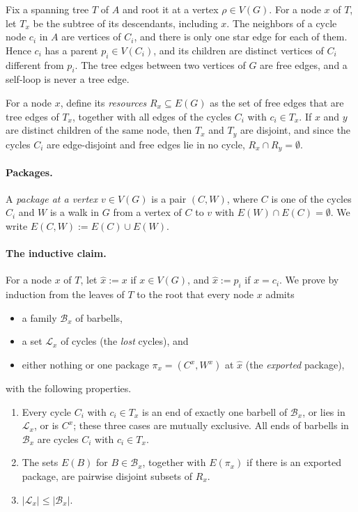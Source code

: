 \documentclass[11pt,a4paper]{article}
\theoremstyle{definition}
\theoremstyle{remark}
\begin{document}
Fix a spanning tree \(T\) of \(A\) and root it at a vertex \(\rho\in V(G)\).
For a node \(x\) of \(T\), let \(T_x\) be the subtree of its descendants,
including \(x\). The neighbors of a cycle node \(c_i\) in \(A\) are vertices of
\(C_i\), and there is only one star edge for each of them. Hence \(c_i\) has a
parent \(p_i\in V(C_i)\), and its children are distinct vertices of
\(C_i\) different from \(p_i\). The tree edges between two vertices of \(G\) are
free edges, and a self-loop is never a tree edge.

For a node \(x\), define its \emph{resources} \(R_x\subseteq E(G)\) as the set
of free edges that are tree edges of \(T_x\), together with all edges of the
cycles \(C_i\) with \(c_i\in T_x\). If \(x\) and \(y\) are distinct children of
the same node, then \(T_x\) and \(T_y\) are disjoint, and since the cycles
\(C_i\) are edge-disjoint and free edges lie in no cycle,
\(R_x\cap R_y=\emptyset\).

\paragraph{Packages.}
A \emph{package at a vertex \(v\in V(G)\)} is a pair \((C,W)\), where \(C\) is
one of the cycles \(C_i\) and \(W\) is a walk in \(G\) from a vertex of \(C\) to
\(v\) with \(E(W)\cap E(C)=\emptyset\). We write \(E(C,W):=E(C)\cup E(W)\).

\paragraph{The inductive claim.}
For a node \(x\) of \(T\), let \(\hat x:=x\) if \(x\in V(G)\), and
\(\hat x:=p_i\) if \(x=c_i\). We prove by induction from the leaves of \(T\) to
the root that every node \(x\) admits
\begin{itemize}
\item a family \(\mathcal B_x\) of barbells,
\item a set \(\mathcal L_x\) of cycles (the \emph{lost} cycles), and
\item either nothing or one package \(\pi_x=(C^{x},W^{x})\) at \(\hat x\) (the
  \emph{exported} package),
\end{itemize}
with the following properties.
\begin{enumerate}[label=(P\arabic*)]
\item\label{P:partition} Every cycle \(C_i\) with \(c_i\in T_x\) is an end of
  exactly one barbell of \(\mathcal B_x\), or lies in \(\mathcal L_x\), or is
  \(C^{x}\); these three cases are mutually exclusive. All ends of barbells in
  \(\mathcal B_x\) are cycles \(C_i\) with \(c_i\in T_x\).
\item\label{P:disjoint} The sets \(E(B)\) for \(B\in\mathcal B_x\), together
  with \(E(\pi_x)\) if there is an exported package, are pairwise disjoint
  subsets of \(R_x\).
\item\label{P:count} \(|\mathcal L_x|\le|\mathcal B_x|\).
\end{enumerate}
\end{document}
